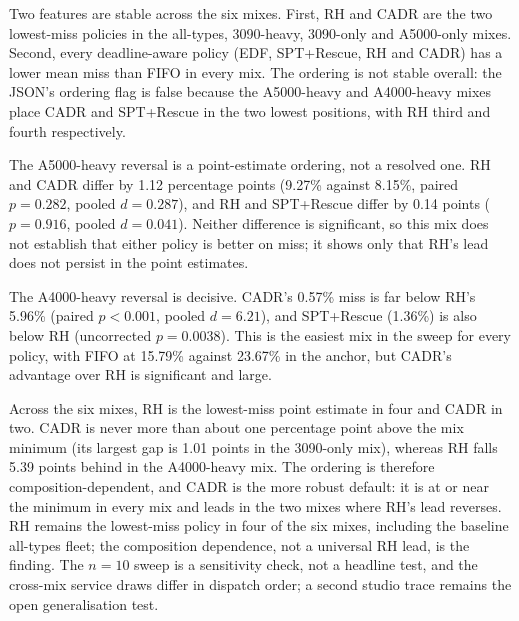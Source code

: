 {\begin{table}[htbp]
\centering
\caption[Fleet-composition sensitivity]{Fleet-composition sensitivity: mean deadline miss rate (\%) for six five-slot mixes, ten seeds each, on the Phase~3 hectic day ($\sim$950 jobs/day, $C_{\max}=5$, $\lambda=0.100$ j/s, 20\% tight 1h / 80\% loose 8h deadlines). The Slots column gives the slot counts in the order RTX~3090 / RTX~A5000 / RTX~A4500 / RTX~A4000. Bold marks the lowest miss rate in each row. The all-types row reproduces the first ten Phase~3 seeds; the other rows are sensitivity checks at $n=10$, not separate headline tests.}
\label{tab:fleet_mix}
\small

\end{table}

Two features are stable across the six mixes. First, RH and CADR are the two lowest-miss policies in the all-types, 3090-heavy, 3090-only and A5000-only mixes. Second, every deadline-aware policy (EDF, SPT+Rescue, RH and CADR) has a lower mean miss than FIFO in every mix. The ordering is not stable overall: the JSON's ordering flag is false because the A5000-heavy and A4000-heavy mixes place CADR and SPT+Rescue in the two lowest positions, with RH third and fourth respectively.

The A5000-heavy reversal is a point-estimate ordering, not a resolved one. RH and CADR differ by 1.12 percentage points (9.27\% against 8.15\%, paired $p=0.282$, pooled $d=0.287$), and RH and SPT+Rescue differ by 0.14 points ($p=0.916$, pooled $d=0.041$). Neither difference is significant, so this mix does not establish that either policy is better on miss; it shows only that RH's lead does not persist in the point estimates.

The A4000-heavy reversal is decisive. CADR's 0.57\% miss is far below RH's 5.96\% (paired $p<0.001$, pooled $d=6.21$), and SPT+Rescue (1.36\%) is also below RH (uncorrected $p=0.0038$). This is the easiest mix in the sweep for every policy, with FIFO at 15.79\% against 23.67\% in the anchor, but CADR's advantage over RH is significant and large.

Across the six mixes, RH is the lowest-miss point estimate in four and CADR in two. CADR is never more than about one percentage point above the mix minimum (its largest gap is 1.01 points in the 3090-only mix), whereas RH falls 5.39 points behind in the A4000-heavy mix. The ordering is therefore composition-dependent, and CADR is the more robust default: it is at or near the minimum in every mix and leads in the two mixes where RH's lead reverses. RH remains the lowest-miss policy in four of the six mixes, including the baseline all-types fleet; the composition dependence, not a universal RH lead, is the finding. The $n=10$ sweep is a sensitivity check, not a headline test, and the cross-mix service draws differ in dispatch order; a second studio trace remains the open generalisation test.

}
